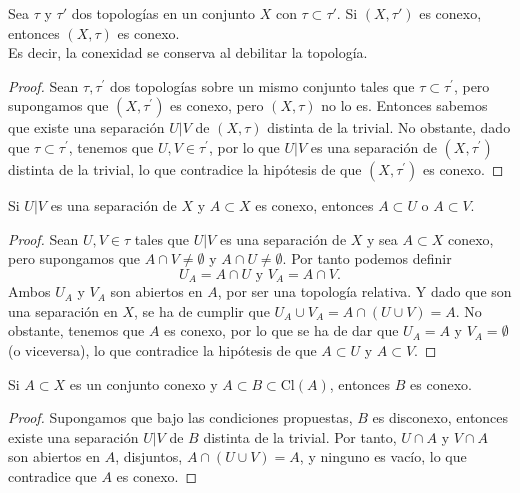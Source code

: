 \begin{proposición}
    Sea $\tau$ y $\tau'$ dos topologías en un conjunto $X$ con $\tau \subset \tau'$. Si $(X, \tau')$ es conexo, entonces $(X, \tau)$ es conexo. \\
    Es decir, la conexidad se conserva al debilitar la topología.
\end{proposición}
\begin{proof}
    Sean $\tau, \tau^{\prime}$ dos topologías sobre un mismo conjunto tales que $\tau \subset \tau^{\prime}$, pero supongamos que $(X, \tau^{\prime})$ es conexo, pero $(X, \tau)$ no lo es. Entonces sabemos que existe una separación $U|V$ de $(X, \tau)$ distinta de la trivial. No obstante, dado que $\tau \subset \tau^{\prime}$, tenemos que $U, V \in \tau^{\prime}$, por lo que $U|V$ es una separación de $(X, \tau^{\prime})$ distinta de la trivial, lo que contradice la hipótesis de que $(X, \tau^{\prime})$ es conexo.
\end{proof}
\begin{proposición}
    Si $U|V$ es una separación de $X$ y $A \subset X$ es conexo, entonces $A \subset U$ o $A \subset V$.
\end{proposición}
\begin{proof}
    Sean $U, V \in \tau$ tales que $U|V$ es una separación de $X$ y sea $A \subset X$ conexo, pero supongamos que $A \cap V \neq \emptyset$ y $A \cap U \neq \emptyset$. Por tanto podemos definir 
    $$U_A = A \cap U \text{ y } V_A = A \cap V.$$
    Ambos $U_A$ y $V_A$ son abiertos en $A$, por ser una topología relativa. Y dado que son una separación en $X$, se ha de cumplir que $U_A \cup V_A = A \cap (U \cup V) = A$. No obstante, tenemos que $A$ es conexo, por lo que se ha de dar que $U_A = A$ y $V_A = \emptyset$ (o viceversa), lo que contradice la hipótesis de que $A \subset U$ y $A \subset V$.
\end{proof}
\begin{proposición}
    Si $A \subset X$ es un conjunto conexo y $A \subset B \subset \mathrm{Cl}(A)$, entonces $B$ es conexo.
\end{proposición}
\begin{proof}
    Supongamos que bajo las condiciones propuestas, $B$ es disconexo, entonces existe una separación $U|V$ de $B$ distinta de la trivial. Por tanto, $U \cap A$ y $V \cap A$ son abiertos en $A$, disjuntos, $A \cap (U \cup V) = A$, y ninguno es vacío, lo que contradice que $A$ es conexo.
\end{proof}
